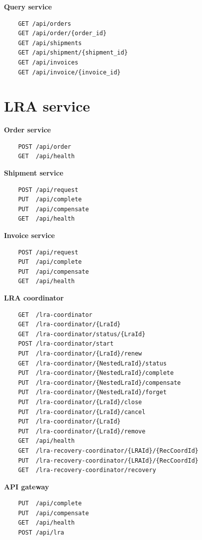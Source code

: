 \documentclass[oneside,
  digital, %
  table,   %
  nolof,     %
  nolot,     %
]{fithesis3}
\begin{document}
\noindent
\textbf{Query service}

\begin{verbatim}
    GET /api/orders
    GET /api/order/{order_id}
    GET /api/shipments
    GET /api/shipment/{shipment_id}
    GET /api/invoices
    GET /api/invoice/{invoice_id}
\end{verbatim}

\section{LRA service}

\textbf{Order service}

\begin{verbatim}
    POST /api/order
    GET  /api/health
\end{verbatim}

\noindent
\textbf{Shipment service}

\begin{verbatim}
    POST /api/request
    PUT  /api/complete
    PUT  /api/compensate
    GET  /api/health
\end{verbatim}

\noindent
\textbf{Invoice service}

\begin{verbatim}
    POST /api/request
    PUT  /api/complete
    PUT  /api/compensate
    GET  /api/health
\end{verbatim}

\noindent
\textbf{LRA coordinator}

\begin{verbatim}
    GET  /lra-coordinator
    GET  /lra-coordinator/{LraId}
    GET  /lra-coordinator/status/{LraId}
    POST /lra-coordinator/start
    PUT  /lra-coordinator/{LraId}/renew
    GET  /lra-coordinator/{NestedLraId}/status
    PUT  /lra-coordinator/{NestedLraId}/complete
    PUT  /lra-coordinator/{NestedLraId}/compensate
    PUT  /lra-coordinator/{NestedLraId}/forget
    PUT  /lra-coordinator/{LraId}/close
    PUT  /lra-coordinator/{LraId}/cancel
    PUT  /lra-coordinator/{LraId}
    PUT  /lra-coordinator/{LraId}/remove
    GET  /api/health
    GET  /lra-recovery-coordinator/{LRAId}/{RecCoordId}
    PUT  /lra-recovery-coordinator/{LRAId}/{RecCoordId}
    GET  /lra-recovery-coordinator/recovery
\end{verbatim}

\noindent
\textbf{API gateway}

\begin{verbatim}
    PUT  /api/complete
    PUT  /api/compensate
    GET  /api/health
    POST /api/lra
\end{verbatim}
\end{document}
